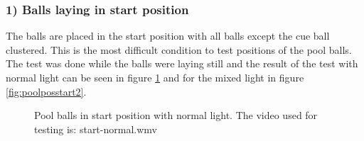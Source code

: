 \subsubsection{ 1) Balls laying in start position}
The balls are placed in the start position with all balls except the cue ball clustered. This is the most difficult condition to test positions of the pool balls. The test was done while the balls were laying still and the result of the test with normal light can be seen in figure \ref{fig:poolposstart} and for the mixed light in figure \ref{fig:poolposstart2}.

\begin{figure}[H]
  \centering
\quad
   \caption{Pool balls in start position with normal light. The video used for testing is: start-normal.wmv}
  \label{fig:poolposstart}
\end{figure}


